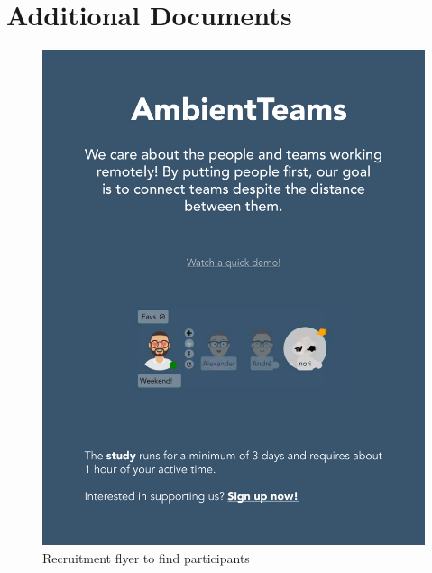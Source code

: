 \chapter{Additional Documents}
\begin{figure}[h]
    \centering
    \includegraphics[width=.8\linewidth]{./images/AmbientTeams_Flyer.pdf}
    \caption{Recruitment flyer to find participants}
    \label{fig:recruitement_flyer}
\end{figure}
